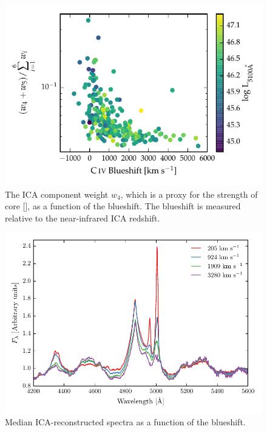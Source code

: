 \begin{figure}
    \centering
    \includegraphics[width=\textwidth]{figures/chapter04/civ_blueshift_oiii_strength.pdf} 
    \caption[{The ICA component weight $w_4$, which is a proxy for the strength of core [], as a function of the  blueshift.}]{The ICA component weight $w_4$, which is a proxy for the strength of core [], as a function of the  blueshift. The  blueshift is measured relative to the near-infrared ICA redshift.}     
    \label{fig:civ_blueshift_oiii_strength}
\end{figure}

\begin{figure}
    \centering
    \includegraphics[width=\columnwidth]{figures/chapter04/mfica_composites.pdf} 
    \caption[{Median ICA-reconstructed spectra as a function of the  blueshift.}]{Median ICA-reconstructed spectra as a function of the  blueshift.}     
    \label{fig:mfica_composites}
\end{figure}

